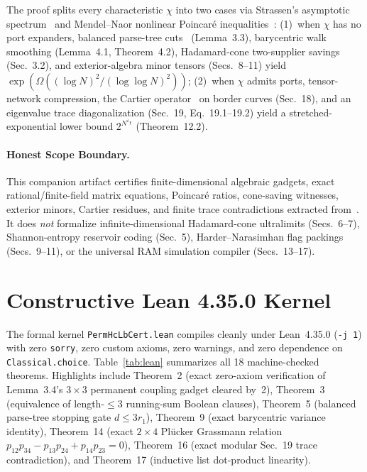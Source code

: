 \documentclass[10pt,twocolumn]{article}
\begin{document}
The proof splits every characteristic $\chi$ into two cases via Strassen's asymptotic spectrum~\cite{strassen1988asymptotic,openai2026tensorspectrum} and Mendel--Naor nonlinear Poincar\'e inequalities~\cite{mendel2014nonlinear}: (1)~when $\chi$ has no port expanders, balanced parse-tree cuts~\cite{valiant1983fast} (Lemma~3.3), barycentric walk smoothing (Lemma~4.1, Theorem~4.2), Hadamard-cone two-supplier savings (Sec.~3.2), and exterior-algebra minor tensors (Secs.~8--11) yield $\exp(\Omega((\log N)^2/(\log\log N)^2))$; (2)~when $\chi$ admits ports, tensor-network compression, the Cartier operator~\cite{cartier1957nouvelle} on border curves (Sec.~18), and an eigenvalue trace diagonalization (Sec.~19, Eq.~19.1--19.2) yield a stretched-exponential lower bound $2^{N^{\varepsilon_\chi}}$ (Theorem~12.2).

\paragraph{Honest Scope Boundary.}
This companion artifact certifies finite-dimensional algebraic gadgets, exact rational/finite-field matrix equations, Poincar\'e ratios, cone-saving witnesses, exterior minors, Cartier residues, and finite trace contradictions extracted from~\cite{openai2026permhc}. It does \emph{not} formalize infinite-dimensional Hadamard-cone ultralimits (Secs.~6--7), Shannon-entropy reservoir coding (Sec.~5), Harder--Narasimhan flag packings (Secs.~9--11), or the universal RAM simulation compiler (Secs.~13--17).

\section{Constructive Lean 4.35.0 Kernel}
The formal kernel \texttt{PermHcLbCert.lean} compiles cleanly under Lean~4.35.0 (\texttt{-j 1}) with zero \texttt{sorry}, zero custom axioms, zero warnings, and zero dependence on \texttt{Classical.choice}. Table~\ref{tab:lean} summarizes all 18 machine-checked theorems. Highlights include Theorem~2 (exact zero-axiom verification of Lemma~3.4's $3\times 3$ permanent coupling gadget cleared by~2), Theorem~3 (equivalence of length-$\le 3$ running-sum Boolean clauses), Theorem~5 (balanced parse-tree stopping gate $d \le 3r_1$), Theorem~9 (exact barycentric variance identity), Theorem~14 (exact $2\times 4$ Pl\"ucker Grassmann relation $p_{12}p_{34}-p_{13}p_{24}+p_{14}p_{23}=0$), Theorem~16 (exact modular Sec.~19 trace contradiction), and Theorem~17 (inductive list dot-product linearity).
\end{document}
